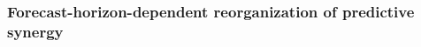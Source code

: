 \documentclass[fleqn,10pt]{wlscirep}
\theoremstyle{naturetheorem}
\begin{document}

\subsubsection*{Forecast-horizon-dependent reorganization of predictive synergy}
\end{document}
